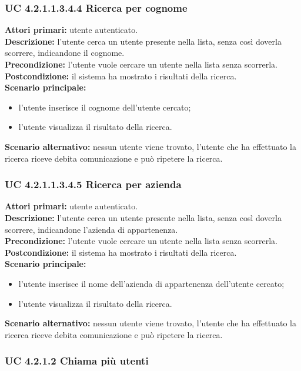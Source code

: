 \subsubsection{UC 4.2.1.1.3.4.4 Ricerca per cognome}
\noindent
\textbf{Attori primari:} utente autenticato.\\
\textbf{Descrizione:} l'utente cerca un utente presente nella lista, senza così doverla scorrere, indicandone il cognome.\\
\textbf{Precondizione:} l'utente vuole cercare un utente nella lista senza scorrerla.\\
\textbf{Postcondizione:} il sistema ha mostrato i risultati della ricerca.\\
\textbf{Scenario principale:}
\begin{itemize}
\item l'utente inserisce il cognome dell'utente cercato;
\item l'utente visualizza il risultato della ricerca.
\end{itemize}
\textbf{Scenario alternativo:} nessun utente viene trovato, l'utente che ha effettuato la ricerca riceve debita comunicazione e può ripetere la ricerca.

\subsubsection{UC 4.2.1.1.3.4.5 Ricerca per azienda}
\noindent
\textbf{Attori primari:} utente autenticato.\\
\textbf{Descrizione:} l'utente cerca un utente presente nella lista, senza così doverla scorrere, indicandone l'azienda di appartenenza.\\
\textbf{Precondizione:} l'utente vuole cercare un utente nella lista senza scorrerla.\\
\textbf{Postcondizione:} il sistema ha mostrato i risultati della ricerca.\\
\textbf{Scenario principale:}
\begin{itemize}
\item l'utente inserisce il nome dell'azienda di appartenenza dell'utente cercato;
\item l'utente visualizza il risultato della ricerca.
\end{itemize}
\textbf{Scenario alternativo:} nessun utente viene trovato, l'utente che ha effettuato la ricerca riceve debita comunicazione e può ripetere la ricerca.

\subsubsection{UC 4.2.1.2 Chiama più utenti}


